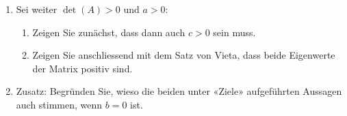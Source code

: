 \begin{LA}
\begin{enumerate}[resume]
		      Weil wir Matrizen mit \(\det(A) > 0\) betrachten, folgt daraus, dass die beiden Eigenwerte das gleiche Vorzeichen haben!
		\item Sei weiter \(\det(A) > 0\) und \(a > 0\):
		      \begin{enumerate}
			      \item Zeigen Sie zunächst, dass dann auch \(c > 0\) sein muss.
			      \item Zeigen Sie anschliessend mit dem Satz von Vieta, dass beide Eigenwerte der Matrix positiv sind.
		      \end{enumerate}
		\item Zusatz: Begründen Sie, wieso die beiden unter «Ziele» aufgeführten Aussagen auch stimmen, wenn \(b = 0\) ist.
	\end{enumerate}


\end{LA}

\clearpage

